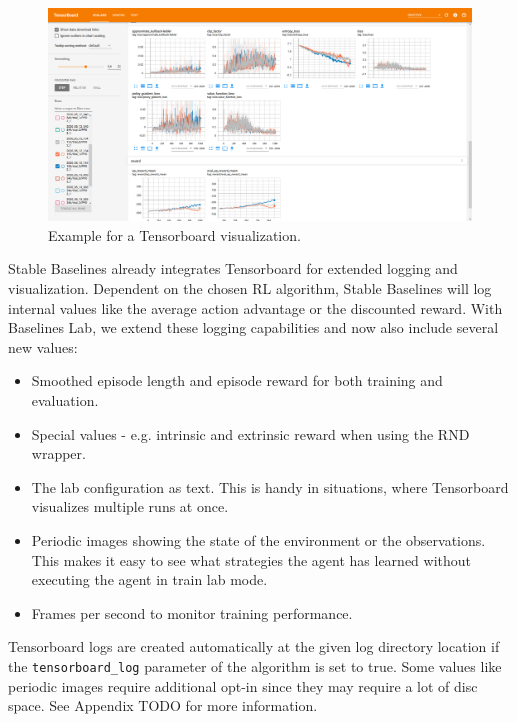 \begin{figure}[ht]
    
    \begin{center}
        \includegraphics[clip, width=0.95\columnwidth]{figures/implementation/Tensorboard.png}
    \end{center}
    
    \caption[Tensorboard Example]{Example for a Tensorboard visualization.}
    \label{fig:TensorboardExample}
  \end{figure}

Stable Baselines already integrates Tensorboard for extended logging and visualization. Dependent on the chosen RL algorithm, Stable Baselines will log internal values like the average action advantage or the discounted reward. With Baselines Lab, we extend these logging capabilities and now also include several new values:

\begin{itemize}
    \item Smoothed episode length and episode reward for both training and evaluation.
    \item Special values - e.g. intrinsic and extrinsic reward when using the RND wrapper.
    \item The lab configuration as text. This is handy in situations, where Tensorboard visualizes multiple runs at once.
    \item Periodic images showing the state of the environment or the observations. This makes it easy to see what strategies the agent has learned without executing the agent in train lab mode.
    \item Frames per second to monitor training performance.
\end{itemize}

Tensorboard logs are created automatically at the given log directory location if the \texttt{tensorboard\_log} parameter of the algorithm is set to true. Some values like periodic images require additional opt-in since they may require a lot of disc space. See Appendix TODO for more information.

